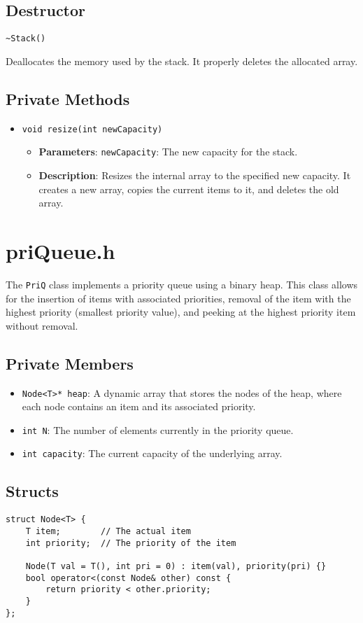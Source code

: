 \documentclass{article}
\begin{document}
\subsection{Destructor}
\begin{verbatim}
~Stack()
\end{verbatim}
Deallocates the memory used by the stack. It properly deletes the allocated array.

\subsection{Private Methods}
\begin{itemize}
    \item \texttt{void resize(int newCapacity)}
    \begin{itemize}
        \item \textbf{Parameters}: \texttt{newCapacity}: The new capacity for the stack.
        \item \textbf{Description}: Resizes the internal array to the specified new capacity. It creates a new array, copies the current items to it, and deletes the old array.
    \end{itemize}
\end{itemize}

\section{priQueue.h}
The \texttt{PriQ} class implements a priority queue using a binary heap. This class allows for the insertion of items with associated priorities, removal of the item with the highest priority (smallest priority value), and peeking at the highest priority item without removal.

\subsection{Private Members}
\begin{itemize}
    \item \texttt{Node<T>* heap}: A dynamic array that stores the nodes of the heap, where each node contains an item and its associated priority.
    \item \texttt{int N}: The number of elements currently in the priority queue.
    \item \texttt{int capacity}: The current capacity of the underlying array.
\end{itemize}

\subsection{Structs}
\begin{verbatim}
struct Node<T> {
    T item;        // The actual item
    int priority;  // The priority of the item

    Node(T val = T(), int pri = 0) : item(val), priority(pri) {}
    bool operator<(const Node& other) const {
        return priority < other.priority;
    }
};
\end{verbatim}
\end{document}
